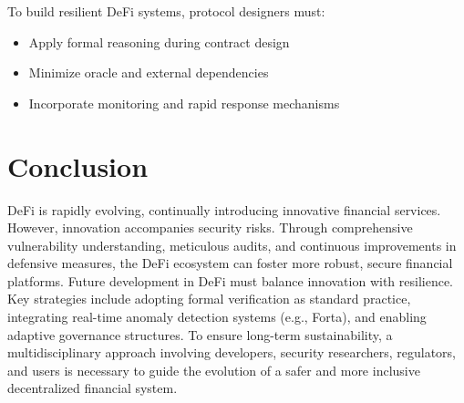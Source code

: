 \documentclass[conference]{IEEEtran}
\begin{document}
To build resilient DeFi systems, protocol designers must:
\begin{itemize}
  \item Apply formal reasoning during contract design
  \item Minimize oracle and external dependencies
  \item Incorporate monitoring and rapid response mechanisms
\end{itemize}

\section{Conclusion}
DeFi is rapidly evolving, continually introducing innovative financial services. However, innovation accompanies security risks. Through comprehensive vulnerability understanding, meticulous audits, and continuous improvements in defensive measures, the DeFi ecosystem can foster more robust, secure financial platforms. Future development in DeFi must balance innovation with resilience. Key strategies include adopting formal verification as standard practice, integrating real-time anomaly detection systems (e.g., Forta), and enabling adaptive governance structures. To ensure long-term sustainability, a multidisciplinary approach involving developers, security researchers, regulators, and users is necessary to guide the evolution of a safer and more inclusive decentralized financial system.



\end{document}
